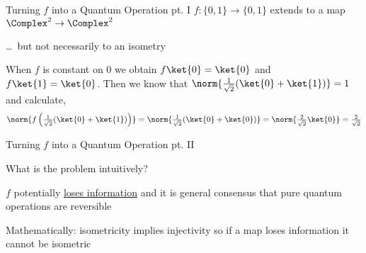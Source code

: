 \documentclass{beamer}
\begin{document}
\begin{frame}{Turning $f$ into a Quantum Operation pt. I}
        $f : \{0,1\} \to \{0,1\}$ extends to a map $\Complex^2 \to
        \Complex^2$

        \dots\ but not necessarily to an isometry

        \vfill
        \begin{example}
                When $f$ is constant on $0$ we obtain $f \ket{0} = \ket{0}$ and
                $f \ket{1} = \ket{0}$. Then we know that
                $\norm{ \frac{1}{\sqrt{2}} (\ket{0} + \ket{1}) } = 1$ and calculate,
                \[
                        \textstyle{ \norm{f \left 
                        ( \frac{1}{\sqrt{2}} (\ket{0} + \ket{1})\right ) } }
                        = \textstyle{ \norm{ 
                        \frac{1}{\sqrt{2}} (\ket{0} + \ket{0}) } }
                        = \textstyle{ \norm{ 
                        \frac{2}{\sqrt{2}} \ket{0} } } =
                        \textstyle{\frac{2}{\sqrt{2}}} 
                \]
        \end{example}
\end{frame}

\begin{frame}{Turning $f$ into a Quantum Operation pt. II}

        What is the problem intuitively?
        \pause

        $f$ potentially \alert{\underline{loses information}} and it is general
        consensus that pure quantum operations are reversible


        \vspace{0.8cm}
        Mathematically: isometricity implies injectivity so if a map loses
        information it cannot be isometric
\end{frame}
\end{document}
